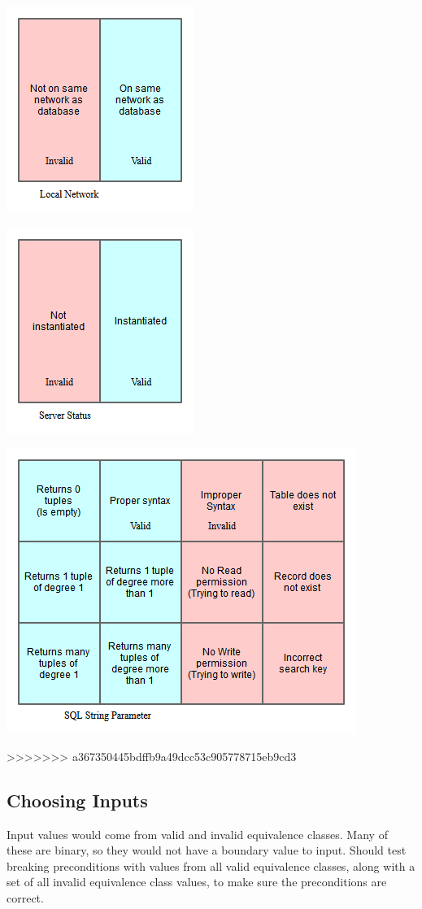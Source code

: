 \documentclass{article}
\begin{document}
\centerline{\includegraphics[scale=1]{../images/EquivalenceClass_LAN}}
\centerline{\includegraphics[scale=1]{../images/EquivalenceClass_Server}}
\centerline{\includegraphics[scale=1]{../images/EquivalenceClass_SQL}}
>>>>>>> a367350445bdffb9a49dcc53c905778715eb9cd3

\subsection{Choosing Inputs}
Input values would come from valid and invalid equivalence classes.  Many of these are binary, so they would not have a boundary value to input.  Should test breaking preconditions with values from all valid equivalence classes, along with a set of all invalid equivalence class values, to make sure the preconditions are correct.
\end{document}
